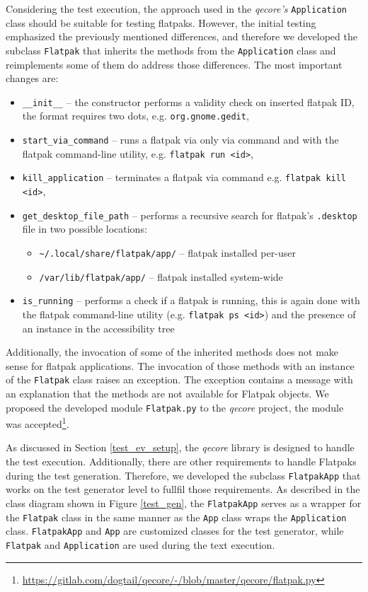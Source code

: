 Considering the test execution, the approach used in the \textit{qecore's} \texttt{Application} class should be suitable for testing flatpaks. However, the initial testing emphasized the previously mentioned differences, and therefore we developed the subclass \texttt{Flatpak} that inherits the methods from the \texttt{Application} class and reimplements some of them do address those differences. The most important changes are:

\begin{itemize} 
    \item \texttt{\_\_init\_\_} -- the constructor performs a validity check on inserted flatpak ID, the format requires two dots, e.g. \texttt{org.gnome.gedit},
    \item \texttt{start\_via\_command} -- runs a flatpak via only via command and with the flatpak command-line utility, e.g. \texttt{flatpak run <id>},
    \item \texttt{kill\_application} -- terminates a flatpak via command e.g. \texttt{flatpak kill <id>},
    \item \texttt{get\_desktop\_file\_path} -- performs a recursive search for flatpak's \texttt{.desktop} file in two possible locations:
    \begin{itemize}
        \item \texttt{\textasciitilde/.local/share/flatpak/app/} -- flatpak installed per-user
        \item \texttt{/var/lib/flatpak/app/} -- flatpak installed system-wide
    \end{itemize} 
    \item \texttt{is\_running} -- performs a check if a flatpak is running, this is again done with the flatpak command-line utility (e.g. \texttt{flatpak ps <id>}) and the presence of an instance in the accessibility tree
\end{itemize}

Additionally, the invocation of some of the inherited methods does not make sense for flatpak applications. The invocation of those methods with an instance of the \texttt{Flatpak} class raises an exception. The exception contains a message with an explanation that the methods are not available for Flatpak objects. We proposed the developed module \texttt{Flatpak.py} to the \textit{qecore} project, the module was accepted{\footnote{\url{https://gitlab.com/dogtail/qecore/-/blob/master/qecore/flatpak.py}}}.

As discussed in Section \ref{test_ev_setup}, the \textit{qecore} library is designed to handle the test execution. Additionally, there are other requirements to handle Flatpaks during the test generation. Therefore, we developed the subclass \texttt{FlatpakApp} that works on the test generator level to fullfil those requirements. As described in the class diagram shown in Figure \ref{test_gen}, the \texttt{FlatpakApp} serves as a wrapper for the \texttt{Flatpak} class in the same manner as the \texttt{App} class wraps the \texttt{Application} class. \texttt{FlatpakApp} and \texttt{App} are customized classes for the test generator, while \texttt{Flatpak} and \texttt{Application} are used during the text execution. 


